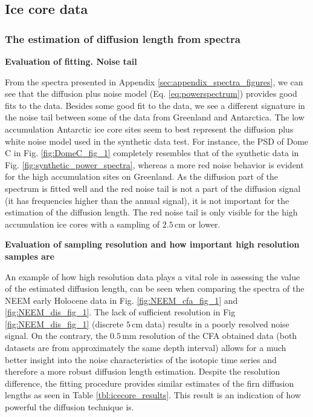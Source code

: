 \documentclass[11pt, draftcls, onecolumn]{IEEEtran} %
\numberwithin{equation}{section}
\numberwithin{table}{section}
\numberwithin{figure}{section}
\begin{document}
\subsection{Ice core data}\label{sec:discussion_icecore}

\subsubsection{The estimation of diffusion length from spectra}
\textbf{Evaluation of fitting. Noise tail}

From the spectra presented in Appendix \ref{sec:appendix_spectra_figures}, 
we can see that the diffusion plus noise model (Eq. \ref{eq:powerspectrum}) provides good fits to the data. 
Besides some good fit to the data, 
we see a different signature in the noise tail between some of the data from Greenland and Antarctica.
The low accumulation Antarctic ice core sites seem to best represent the diffusion plus white noise model
used in the synthetic data test.
For instance, the PSD of Dome C in Fig. \ref{fig:DomeC_fig_1} completely resembles that of the synthetic data
in Fig. \ref{fig:synthetic_power_spectra},
whereas a more red noise behavior is evident for the high accumulation sites on Greenland. 
As the diffusion part of the spectrum is fitted well and the red noise tail
is not a part of the diffusion signal (it has frequencies higher than the annual signal),
it is not important for the estimation of the diffusion length.
The red noise tail is only visible for the high accumulation ice cores with a sampling of $2.5\,\mathrm{cm}$ or lower.


\textbf{Evaluation of sampling resolution and how important high resolution samples are}

An example of how high resolution data plays a vital role in assessing the value of the estimated diffusion length, 
can be seen when comparing the spectra of the NEEM early Holocene data in Fig. \ref{fig:NEEM_cfa_fig_1} and \ref{fig:NEEM_dis_fig_1}. 
The lack of sufficient resolution in Fig \ref{fig:NEEM_dis_fig_1} (discrete $5\,\mathrm{cm}$ data) results in a poorly resolved noise signal. 
On the contrary, the $0.5\,\mathrm{mm}$ resolution of the CFA obtained data (both datasets are from approximately the same depth interval) 
allows for a much better insight into the noise characteristics of the isotopic time series and therefore a more robust diffusion length estimation.
Despite the resolution difference, the fitting procedure provides similar estimates of the firn diffusion lengths as seen in Table \ref{tbl:icecore_results}.
This result is an indication of how powerful the diffusion technique is.
\end{document}
